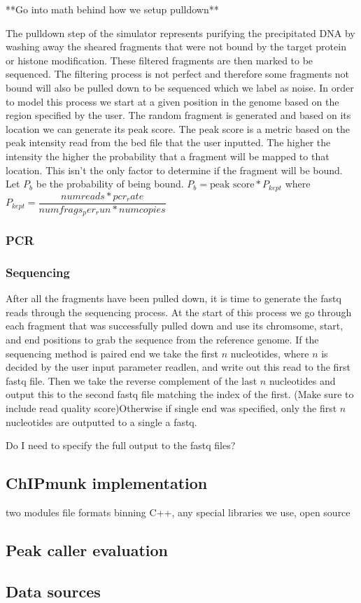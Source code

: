 \documentclass[12pt]{article}
\begin{document}
**Go into math behind how we setup pulldown**

The pulldown step of the simulator represents purifying the precipitated DNA by washing away the sheared fragments that were not bound by the target protein or histone modification. These filtered fragments are then marked to be sequenced. The filtering process is not perfect and therefore some fragments not bound will also be pulled down to be sequenced which we label as noise. In order to model this process we start at a given position in the genome based on the region specified by the user. The random fragment is generated and based on its location we can generate its peak score. The peak score is a metric based on the peak intensity read from the bed file that the user inputted. The higher the intensity the higher the probability that a fragment will be mapped to that location. This isn't the only factor to determine if the fragment will be bound. Let $P_b$ be the probability of being bound. 
$P_b = \text{peak score} * P_{kept}$ where $P_{kept} = \dfrac{numreads * pcr_rate}{numfrags_per_run * numcopies}$

\subsubsection*{PCR}

\subsubsection*{Sequencing}

After all the fragments have been pulled down, it is time to generate the fastq reads through the sequencing process. At the start of this process we go through each fragment that was successfully pulled down and use its chromsome, start, and end positions to grab the sequence from the reference genome. If the sequencing method is paired end we take the first $n$ nucleotides, where $n$ is decided by the user input parameter readlen, and write out this read to the first fastq file. Then we take the reverse complement of the last $n$ nucleotides and output this to the second fastq file matching the index of the first. (Make sure to include read quality score)Otherwise if single end was specified, only the first $n$ nucleotides are outputted to a single a fastq. 

Do I need to specify the full output to the fastq files?

\subsection*{ChIPmunk implementation}

two modules
file formats
binning
C++, any special libraries we use, open source

\subsection*{Peak caller evaluation}

\subsection*{Data sources}
\end{document}
